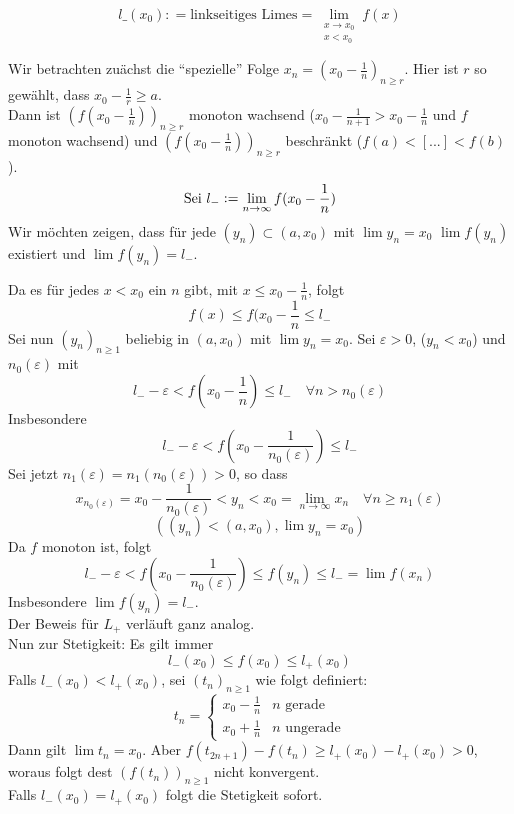 \[l\_\left( {{x_0}} \right): = {\text{linkseitiges Limes}} = \mathop {\lim }\limits_{\begin{array}{*{20}{c}}
{x \to {x_0}}\\
{x < {x_0}}
\end{array}} f(x)\]
\begin{center}
\end{center}
\noindent Wir betrachten zuächst die ``spezielle'' Folge $x_{n}=(x_{0}-\frac{1}{n})_{n\geq r}$. Hier ist $r$ so gewählt, dass $x_{0}-\frac{1}{r}\geq a$. \\
Dann ist $(f(x_{0}-\frac{1}{n}))_{n\geq r}$ monoton wachsend ($x_{0}-\frac{1}{n+1} > x_{0}-\frac{1}{n}$ und $f$ monoton wachsend) und $(f(x_{0}-\frac{1}{n}))_{n\geq r}$ beschränkt ($f(a)<[...]<f(b)$).
\[\text{Sei }l_{-}\vcentcolon=\lim_{n\to\infty}{f(x_{0}-\frac{1}{n})}\]
\noindent Wir möchten zeigen, dass für jede $(y_{n})\subset (a, x_{0})$ mit $\lim{y_{n}}=x_{0}$ $\lim{f(y_{n})}$ existiert und $\lim{f(y_{n})}=l_{-}$. 

Da es für jedes $x<x_{0}$ ein $n$ gibt, mit $x\leq x_{0}-\frac{1}{n}$, folgt \[f(x) \leq f(x_{0}-\frac{1}{n} \leq l_{-}\]
Sei nun $(y_{n})_{n\geq 1}$ beliebig in $(a, x_{0})$ mit $\lim{y_{n}}=x_{0}$. Sei $\varepsilon > 0$, ($y_{n} < x_{0}$) und $n_{0}(\varepsilon)$ mit \[l_{-}-\varepsilon < f(x_{0}-\frac{1}{n})\leq l_{-} \quad \forall n>n_{0}(\varepsilon) \]
Insbesondere
\[l_{-} - \varepsilon < f(x_{0}-\frac{1}{n_{0}(\varepsilon)}) \leq l_{-} \]
Sei jetzt $n_{1}(\varepsilon)=n_{1}(n_{0}(\varepsilon))>0$, so dass \[ x_{n_{0}(\varepsilon)} = x_{0} - \frac{1}{n_{0}(\varepsilon)} < y_{n} < x_{0} = \lim_{n\to\infty}{x_{n}} \quad \forall n \geq n_{1}(\varepsilon)\]
\[ \left((y_{n})<(a,x_{0}), \lim{y_{n}}=x_{0}\right)\]
Da $f$ monoton ist, folgt \[ l_{-} - \varepsilon < f(x_{0}-\frac{1}{n_{0}(\varepsilon)}) \leq f(y_{n}) \leq l_{-} = \lim{f(x_{n})} \]
Insbesondere $\lim{f(y_{n})} = l_{-}$. \\

\noindent Der Beweis für $L_{+}$ verläuft ganz analog. \\

\noindent Nun zur Stetigkeit: Es gilt immer \[ l_{-}(x_{0})\leq f(x_{0}) \leq l_{+}(x_{0}) \]
Falls $l_{-}(x_{0}) < l_{+}(x_{0})$, sei $(t_{n})_{n \geq 1}$ wie folgt definiert:
\[ t_{n}=\begin{cases}x_{0}-\frac{1}{n} &n\text{ gerade} \\ x_{0}+\frac{1}{n} &n\text{ ungerade} \end{cases} \]
Dann gilt $\lim{t_{n}} = x_{0}$. Aber $f(t_{2n+1})-f(t_{n}) \geq l_{+}(x_{0})-l_{+}(x_{0}) >0$, woraus folgt dest  $(f(t_{n}))_{n\geq1}$ nicht konvergent. \\
Falls $l_{-}(x_{0})=l_{+}(x_{0})$ folgt die Stetigkeit sofort.

